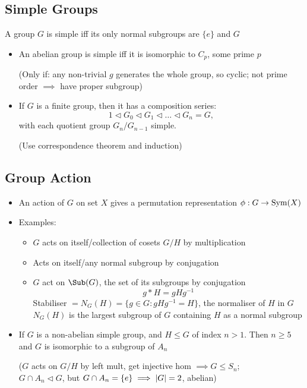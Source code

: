 \subsection*{Simple Groups}
A group $G$ is simple iff its only normal subgroups are $\{e\}$ and $G$
\begin{itemize}
      \item An abelian group is simple iff it is isomorphic to $C_p$, some prime $p$

            (Only if: any non-trivial $g$ generates the whole group, so cyclic; not prime order $\implies$ have proper subgroup)
      \item If $G$ is a finite group, then it has a composition series: \[1 \triangleleft G_0 \triangleleft G_1 \triangleleft \dots \triangleleft G_n = G, \] with each quotient group $G_n/G_{n-1}$ simple.

            (Use correspondence theorem and induction)
\end{itemize}

\subsection*{Group Action}
\begin{itemize}
      \item An action of $G$ on set $X$ gives a permutation representation $\phi: G \to \operatorname{Sym}(X)$
      \item Examples:
            \begin{itemize}
                  \item $G$ acts on itself/collection of cosets $G/H$ by multiplication
                  \item Acts on itself/any normal subgroup by conjugation
                  \item $G$ act on $\Sub(G)$, the set of its subgroups by conjugation
                        \[ g* H = gHg^{-1} \]
                        Stabiliser $= N_G(H) = \{g\in G : gHg^{-1} = H\}$, the normaliser of $H$ in $G$\\
                        $N_G(H)$ is the largest subgroup of $G$ containing $H$ as a normal subgroup
            \end{itemize}

      \item If $G$ is a non-abelian simple group, and $H \leq G$ of index $n >1$. Then $n \geq 5$ and $G$ is isomorphic to a subgroup of $A_n$

            ($G$ acts on $G/H$ by left mult, get injective hom $\implies G \leq S_n$; \\
            $G \cap A_n \triangleleft G$, but $G \cap A_n = \{e\} \implies \left| G \right| = 2$, abelian)
\end{itemize}

